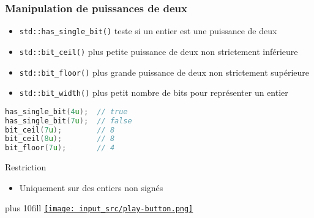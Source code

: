 \documentclass[C++.tex]{subfiles}
\begin{document}
\begin{frame}[fragile]
	\frametitle{Manipulation de puissances de deux}
	\begin{itemize}
		\item \lstinline|std::has_single_bit()| teste si un entier est une puissance de deux
		\item \lstinline|std::bit_ceil()| plus petite puissance de deux non strictement inférieure
		\item \lstinline|std::bit_floor()| plus grande puissance de deux non strictement supérieure
		\item \lstinline|std::bit_width()| plus petit nombre de bits pour représenter un entier
	\end{itemize}

	\begin{lstlisting}[language=C++]
has_single_bit(4u);  // true
has_single_bit(7u);  // false
bit_ceil(7u);        // 8
bit_ceil(8u);        // 8
bit_floor(7u);       // 4\end{lstlisting}

	\begin{alertblock}{Restriction}
		\begin{itemize}
			\item Uniquement sur des entiers non signés
		\end{itemize}
	\end{alertblock}

	\vskip 10mm plus 10fill
	\hfill
	\href{https://godbolt.org/#g:!((g:!((g:!((h:codeEditor,i:(filename:'1',fontScale:14,fontUsePx:'0',j:1,lang:c%2B%2B,selection:(endColumn:1,endLineNumber:11,positionColumn:1,positionLineNumber:11,selectionStartColumn:1,selectionStartLineNumber:6,startColumn:1,startLineNumber:6),source:'%23include+%3Ciostream%3E%0A%23include+%3Cbit%3E%0A%0Aint+main()%0A%7B%0A++std::cout+%3C%3C+std::has_single_bit(4u)+%3C%3C+%22%5Cn%22%3B%0A++std::cout+%3C%3C+std::has_single_bit(7u)+%3C%3C+%22%5Cn%22%3B%0A++std::cout+%3C%3C+std::bit_ceil(7u)++%3C%3C+%22%5Cn%22%3B%0A++std::cout+%3C%3C+std::bit_ceil(8u)++%3C%3C+%22%5Cn%22%3B%0A++std::cout+%3C%3C+std::bit_floor(7u)+%3C%3C+%22%5Cn%22%3B%0A%7D%0A'),l:'5',n:'0',o:'C%2B%2B+source+%231',t:'0')),k:50,l:'4',n:'0',o:'',s:0,t:'0'),(g:!((h:executor,i:(argsPanelShown:'1',compilationPanelShown:'0',compiler:g122,compilerName:'',compilerOutShown:'0',execArgs:'',execStdin:'',fontScale:14,fontUsePx:'0',j:1,lang:c%2B%2B,libs:!((name:boost,ver:'175')),options:'-std%3Dc%2B%2B20+-Wall+-Wextra+-pedantic',source:1,stdinPanelShown:'1',tree:'1',wrap:'0'),l:'5',n:'0',o:'Executor+x86-64+gcc+12.2+(C%2B%2B,+Editor+%231)',t:'0')),header:(),k:50,l:'4',n:'0',o:'',s:0,t:'0')),l:'2',n:'0',o:'',t:'0')),version:4}{\texttt{[image: input\_src/play-button.png]}}
\end{frame}
\end{document}

